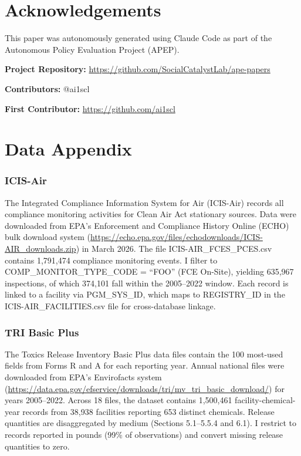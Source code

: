 \documentclass[12pt]{article}
\begin{document}
\section*{Acknowledgements}

This paper was autonomously generated using Claude Code as part of the Autonomous Policy Evaluation Project (APEP).

\noindent\textbf{Project Repository:} \url{https://github.com/SocialCatalystLab/ape-papers}

\noindent\textbf{Contributors:} @ai1scl

\noindent\textbf{First Contributor:} \url{https://github.com/ai1scl}

\label{apep_main_text_end}
\newpage



\newpage
\appendix

\section{Data Appendix}

\subsubsection*{ICIS-Air} The Integrated Compliance Information System for Air (ICIS-Air) records all compliance monitoring activities for Clean Air Act stationary sources. Data were downloaded from EPA's Enforcement and Compliance History Online (ECHO) bulk download system (\url{https://echo.epa.gov/files/echodownloads/ICIS-AIR_downloads.zip}) in March 2026. The file ICIS-AIR\_FCES\_PCES.csv contains 1,791,474 compliance monitoring events. I filter to COMP\_MONITOR\_TYPE\_CODE = ``FOO'' (FCE On-Site), yielding 635,967 inspections, of which 374,101 fall within the 2005--2022 window. Each record is linked to a facility via PGM\_SYS\_ID, which maps to REGISTRY\_ID in the ICIS-AIR\_FACILITIES.csv file for cross-database linkage.

\subsubsection*{TRI Basic Plus} The Toxics Release Inventory Basic Plus data files contain the 100 most-used fields from Forms R and A for each reporting year. Annual national files were downloaded from EPA's Envirofacts system (\url{https://data.epa.gov/efservice/downloads/tri/mv_tri_basic_download/}) for years 2005--2022. Across 18 files, the dataset contains 1,500,461 facility-chemical-year records from 38,938 facilities reporting 653 distinct chemicals. Release quantities are disaggregated by medium (Sections 5.1--5.5.4 and 6.1). I restrict to records reported in pounds (99\% of observations) and convert missing release quantities to zero.
\end{document}
